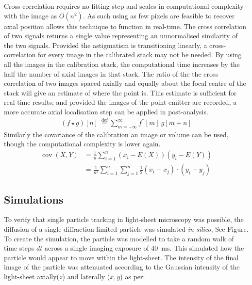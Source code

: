 Cross correlation requires no fitting step and scales in computational complexity with the image as $O(n^2)$. %
As such using as few pixels are feasible to recover axial position allows this technique to function in real-time.
The cross correlation of two signals returns a single value representing an unnormalised similarity of the two signals.
Provided the astigmatism is transitioning linearly, a cross-correlation for every image in the calibrated stack may not be needed.
By using all the images in the calibration stack, the computational time increases by the half the number of axial images in that stack.
The ratio of the the cross correlation of two images spaced axially and equally about the focal centre of the stack will give an estimate of where the point is.
This estimate is sufficient for real-time results; and provided the images of the point-emitter are recorded, a more accurate axial localisation step can be applied in post-analysis.
\begin{align}
(f \star g)[n]\ \stackrel{\mathrm{def}}{=} \sum_{m=-\infty}^{\infty} f^*[m]\ g[m+n]
\end{align}
Similarly the covariance of the calibration an image or volume can be used, though the computational complexity is lower again.
\begin{align}
  \operatorname{cov}(X,Y) &=\frac{1}{n}\sum_{i=1}^n (x_i-E(X))(y_i-E(Y)) \\
 &= \frac{1}{n^2} \sum_{i=1}^n \sum_{j=1}^n \frac{1}{2}(x_i - x_j)\cdot(y_i - y_j)
\end{align}

\subsection{Simulations}
To verify that single particle tracking in light-sheet microscopy was possible, the diffusion of a single diffraction limited particle was simulated \emph{in silico}, See Figure.
To create the simulation, the particle was modelled to take a random walk of time steps $dt$ across a single imaging exposure of \SI{40}{\milli\second}.
This simulated how the particle would appear to move within the light-sheet.
The intensity of the final image of the particle was attenuated according to the Gaussian intensity of the light-sheet axially($z$) and laterally ($x,y$) as per:

